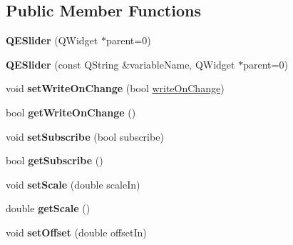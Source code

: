 \subsection*{Public Member Functions}
\begin{DoxyCompactItemize}
\item 
\hypertarget{classQESlider_acbff7e238bb9c7a0e8858af55b744cd1}{
{\bfseries QESlider} (QWidget $\ast$parent=0)}
\label{classQESlider_acbff7e238bb9c7a0e8858af55b744cd1}

\item 
\hypertarget{classQESlider_a648004902f9136376f157025d6bb0510}{
{\bfseries QESlider} (const QString \&variableName, QWidget $\ast$parent=0)}
\label{classQESlider_a648004902f9136376f157025d6bb0510}

\item 
\hypertarget{classQESlider_a42dcb46689cf3a00c6e6773a27de8845}{
void {\bfseries setWriteOnChange} (bool \hyperlink{classQESlider_a52894436044af84c826eae9bcf2be405}{writeOnChange})}
\label{classQESlider_a42dcb46689cf3a00c6e6773a27de8845}

\item 
\hypertarget{classQESlider_a0999671c8cce09d10d755947d3aff015}{
bool {\bfseries getWriteOnChange} ()}
\label{classQESlider_a0999671c8cce09d10d755947d3aff015}

\item 
\hypertarget{classQESlider_a963028fc5e7b73e3fff7dc0a422d57eb}{
void {\bfseries setSubscribe} (bool subscribe)}
\label{classQESlider_a963028fc5e7b73e3fff7dc0a422d57eb}

\item 
\hypertarget{classQESlider_a6eaf4b233273e5fb91c4517b3f9aea6d}{
bool {\bfseries getSubscribe} ()}
\label{classQESlider_a6eaf4b233273e5fb91c4517b3f9aea6d}

\item 
\hypertarget{classQESlider_ad7ec32dc8d647a3b55777e2159b0429f}{
void {\bfseries setScale} (double scaleIn)}
\label{classQESlider_ad7ec32dc8d647a3b55777e2159b0429f}

\item 
\hypertarget{classQESlider_a58fc83b42f0088a041300315540a44df}{
double {\bfseries getScale} ()}
\label{classQESlider_a58fc83b42f0088a041300315540a44df}

\item 
\hypertarget{classQESlider_a5ba7e3dfbb7b60bd7e00c65da1e17c47}{
void {\bfseries setOffset} (double offsetIn)}
\label{classQESlider_a5ba7e3dfbb7b60bd7e00c65da1e17c47}


\end{DoxyCompactItemize}
